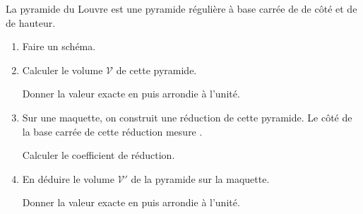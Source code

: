 \begin{exercice*}
    La pyramide du Louvre est une pyramide régulière à base carrée de  de côté et de  de hauteur.

    \begin{enumerate}
        \item Faire un schéma.
        \item Calculer le volume $\mathcal{V}$ de cette pyramide.
        
        Donner la valeur exacte en \Vol[m]{} puis arrondie à l'unité.
        \item Sur une maquette, on construit une réduction de cette pyramide. Le côté de la base
        carrée de cette réduction mesure .

        \medskip
        Calculer le coefficient de réduction.
        \item En déduire le volume $\mathcal{V}'$ de la pyramide sur la maquette.
        
        Donner la valeur exacte en \Vol{} puis arrondie à l'unité.
    \end{enumerate}
\end{exercice*}
